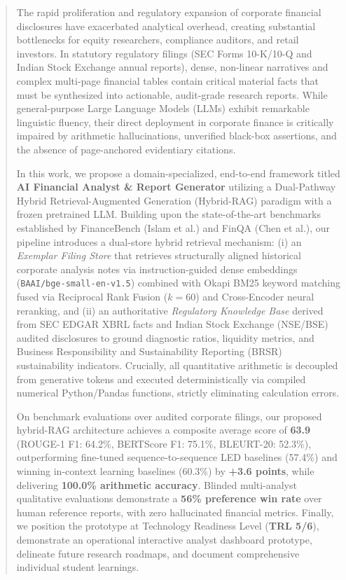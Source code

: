 \documentclass[conference]{IEEEtran}
\begin{document}
\begin{abstract}
The rapid proliferation and regulatory expansion of corporate financial disclosures have exacerbated analytical overhead, creating substantial bottlenecks for equity researchers, compliance auditors, and retail investors. In statutory regulatory filings (SEC Forms 10-K/10-Q and Indian Stock Exchange annual reports), dense, non-linear narratives and complex multi-page financial tables contain critical material facts that must be synthesized into actionable, audit-grade research reports. While general-purpose Large Language Models (LLMs) exhibit remarkable linguistic fluency, their direct deployment in corporate finance is critically impaired by arithmetic hallucinations, unverified black-box assertions, and the absence of page-anchored evidentiary citations.

In this work, we propose a domain-specialized, end-to-end framework titled \textbf{AI Financial Analyst \& Report Generator} utilizing a Dual-Pathway Hybrid Retrieval-Augmented Generation (Hybrid-RAG) paradigm with a frozen pretrained LLM. Building upon the state-of-the-art benchmarks established by FinanceBench (Islam et al.) and FinQA (Chen et al.), our pipeline introduces a dual-store hybrid retrieval mechanism: (i) an \textit{Exemplar Filing Store} that retrieves structurally aligned historical corporate analysis notes via instruction-guided dense embeddings (\texttt{BAAI/bge-small-en-v1.5}) combined with Okapi BM25 keyword matching fused via Reciprocal Rank Fusion ($k=60$) and Cross-Encoder neural reranking, and (ii) an authoritative \textit{Regulatory Knowledge Base} derived from SEC EDGAR XBRL facts and Indian Stock Exchange (NSE/BSE) audited disclosures to ground diagnostic ratios, liquidity metrics, and Business Responsibility and Sustainability Reporting (BRSR) sustainability indicators. Crucially, all quantitative arithmetic is decoupled from generative tokens and executed deterministically via compiled numerical Python/Pandas functions, strictly eliminating calculation errors.

On benchmark evaluations over audited corporate filings, our proposed hybrid-RAG architecture achieves a composite average score of \textbf{63.9} (ROUGE-1 F1: 64.2\%, BERTScore F1: 75.1\%, BLEURT-20: 52.3\%), outperforming fine-tuned sequence-to-sequence LED baselines (57.4\%) and winning in-context learning baselines (60.3\%) by \textbf{+3.6 points}, while delivering \textbf{100.0\% arithmetic accuracy}. Blinded multi-analyst qualitative evaluations demonstrate a \textbf{56\% preference win rate} over human reference reports, with zero hallucinated financial metrics. Finally, we position the prototype at Technology Readiness Level (\textbf{TRL 5/6}), demonstrate an operational interactive analyst dashboard prototype, delineate future research roadmaps, and document comprehensive individual student learnings.
\end{abstract}
\end{document}
